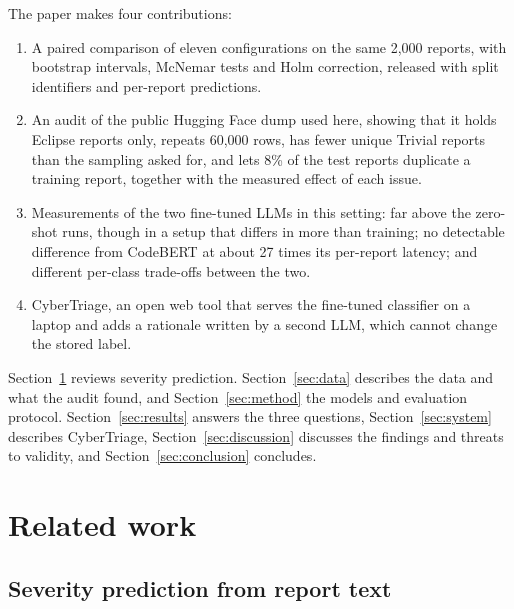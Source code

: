 \documentclass[a4paper,fleqn]{cas-sc}
\begin{document}
\noindent The paper makes four contributions:
\begin{enumerate}
\item A paired comparison of eleven configurations on the same 2,000 reports, with
bootstrap intervals, McNemar tests and Holm correction, released with split
identifiers and per-report predictions.
\item An audit of the public Hugging Face dump used here, showing that it holds Eclipse
reports only, repeats 60,000 rows, has fewer unique Trivial reports than the sampling
asked for, and lets 8\% of the test reports duplicate a training report, together with
the measured effect of each issue.
\item Measurements of the two fine-tuned LLMs in this setting: far above the zero-shot
runs, though in a setup that differs in more than training; no detectable difference
from CodeBERT at about 27 times its per-report latency; and different per-class
trade-offs between the two.
\item CyberTriage, an open web tool that serves the fine-tuned classifier on a laptop
and adds a rationale written by a second LLM, which cannot change the stored label.
\end{enumerate}

Section~\ref{sec:related} reviews severity prediction. Section~\ref{sec:data}
describes the data and what the audit found, and Section~\ref{sec:method} the models
and evaluation protocol. Section~\ref{sec:results} answers the three questions,
Section~\ref{sec:system} describes CyberTriage, Section~\ref{sec:discussion} discusses
the findings and threats to validity, and Section~\ref{sec:conclusion} concludes.

\section{Related work}
\label{sec:related}

\subsection{Severity prediction from report text}
\end{document}
